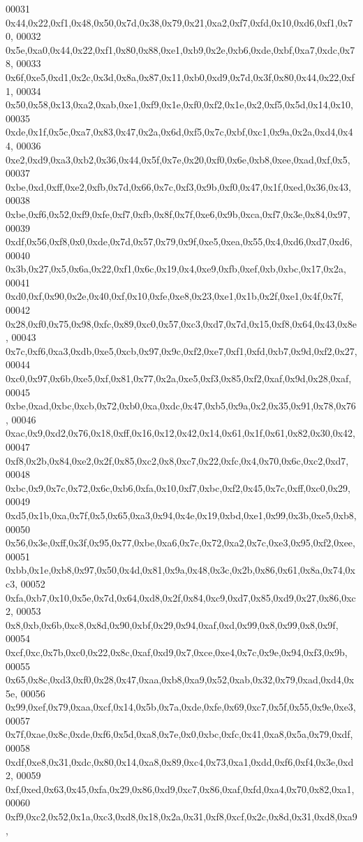 \begin{DoxyCode}
00031   0x44,0x22,0xf1,0x48,0x50,0x7d,0x38,0x79,0x21,0xa2,0xf7,0xfd,0x10,0xd6,0xf1,0x70,
00032   0x5e,0xa0,0x44,0x22,0xf1,0x80,0x88,0xe1,0xb9,0x2e,0xb6,0xde,0xbf,0xa7,0xdc,0x78,
00033   0x6f,0xe5,0xd1,0x2c,0x3d,0x8a,0x87,0x11,0xb0,0xd9,0x7d,0x3f,0x80,0x44,0x22,0xf1,
00034   0x50,0x58,0x13,0xa2,0xab,0xe1,0xf9,0x1e,0xf0,0xf2,0x1e,0x2,0xf5,0x5d,0x14,0x10,
00035   0xde,0x1f,0x5c,0xa7,0x83,0x47,0x2a,0x6d,0xf5,0x7c,0xbf,0xc1,0x9a,0x2a,0xd4,0x44,
00036   0xe2,0xd9,0xa3,0xb2,0x36,0x44,0x5f,0x7e,0x20,0xf0,0x6e,0xb8,0xee,0xad,0xf,0x5,
00037   0xbe,0xd,0xff,0xe2,0xfb,0x7d,0x66,0x7c,0xf3,0x9b,0xf0,0x47,0x1f,0xed,0x36,0x43,
00038   0xbe,0xf6,0x52,0xf9,0xfe,0xf7,0xfb,0x8f,0x7f,0xe6,0x9b,0xca,0xf7,0x3e,0x84,0x97,
00039   0xdf,0x56,0xf8,0x0,0xde,0x7d,0x57,0x79,0x9f,0xe5,0xea,0x55,0x4,0xd6,0xd7,0xd6,
00040   0x3b,0x27,0x5,0x6a,0x22,0xf1,0x6c,0x19,0x4,0xe9,0xfb,0xef,0xb,0xbc,0x17,0x2a,
00041   0xd0,0xf,0x90,0x2e,0x40,0xf,0x10,0xfe,0xe8,0x23,0xe1,0x1b,0x2f,0xe1,0x4f,0x7f,
00042   0x28,0xf0,0x75,0x98,0xfc,0x89,0xc0,0x57,0xc3,0xd7,0x7d,0x15,0xf8,0x64,0x43,0x8e,
00043   0x7c,0xf6,0xa3,0xdb,0xe5,0xcb,0x97,0x9c,0xf2,0xe7,0xf1,0xfd,0xb7,0x9d,0xf2,0x27,
00044   0xc0,0x97,0x6b,0xe5,0xf,0x81,0x77,0x2a,0xe5,0xf3,0x85,0xf2,0xaf,0x9d,0x28,0xaf,
00045   0xbe,0xad,0xbc,0xcb,0x72,0xb0,0xa,0xdc,0x47,0xb5,0x9a,0x2,0x35,0x91,0x78,0x76,
00046   0xac,0x9,0xd2,0x76,0x18,0xff,0x16,0x12,0x42,0x14,0x61,0x1f,0x61,0x82,0x30,0x42,
00047   0xf8,0x2b,0x84,0xe2,0x2f,0x85,0xc2,0x8,0xc7,0x22,0xfc,0x4,0x70,0x6c,0xc2,0xd7,
00048   0xbc,0x9,0x7c,0x72,0x6c,0xb6,0xfa,0x10,0xf7,0xbc,0xf2,0x45,0x7c,0xff,0xc0,0x29,
00049   0xd5,0x1b,0xa,0x7f,0x5,0x65,0xa3,0x94,0x4e,0x19,0xbd,0xe1,0x99,0x3b,0xe5,0xb8,
00050   0x56,0x3e,0xff,0x3f,0x95,0x77,0xbe,0xa6,0x7c,0x72,0xa2,0x7c,0xe3,0x95,0xf2,0xee,
00051   0xbb,0x1e,0xb8,0x97,0x50,0x4d,0x81,0x9a,0x48,0x3c,0x2b,0x86,0x61,0x8a,0x74,0xc3,
00052   0xfa,0xb7,0x10,0x5e,0x7d,0x64,0xd8,0x2f,0x84,0xc9,0xd7,0x85,0xd9,0x27,0x86,0xc2,
00053   0x8,0xb,0x6b,0xc8,0x8d,0x90,0xbf,0x29,0x94,0xaf,0xd,0x99,0x8,0x99,0x8,0x9f,
00054   0xcf,0xc,0x7b,0xc0,0x22,0x8c,0xaf,0xd9,0x7,0xce,0xe4,0x7c,0x9e,0x94,0xf3,0x9b,
00055   0x65,0x8c,0xd3,0xf0,0x28,0x47,0xaa,0xb8,0xa9,0x52,0xab,0x32,0x79,0xad,0xd4,0x5e,
00056   0x99,0xef,0x79,0xaa,0xcf,0x14,0x5b,0x7a,0xde,0xfe,0x69,0xc7,0x5f,0x55,0x9e,0xe3,
00057   0x7f,0xae,0x8c,0xde,0xf6,0x5d,0xa8,0x7e,0x0,0xbc,0xfc,0x41,0xa8,0x5a,0x79,0xdf,
00058   0xdf,0xe8,0x31,0xdc,0x80,0x14,0xa8,0x89,0xc4,0x73,0xa1,0xdd,0xf6,0xf4,0x3e,0xd2,
00059   0xf,0xed,0x63,0x45,0xfa,0x29,0x86,0xd9,0xc7,0x86,0xaf,0xfd,0xa4,0x70,0x82,0xa1,
00060   0xf9,0xc2,0x52,0x1a,0xc3,0xd8,0x18,0x2a,0x31,0xf8,0xcf,0x2c,0x8d,0x31,0xd8,0xa9,

\end{DoxyCode}

